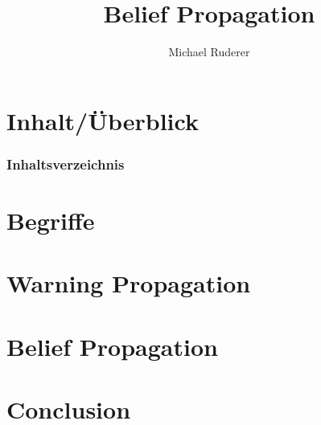 \documentclass{beamer}
\title{Belief Propagation}
\author{Michael Ruderer}
\institute
{Uni Ulm\\}
\begin{document}
\hspace*{-1.49cm}
\frame[plain]{\titlepage}

\hspace*{-0.7cm}
\section*{Inhalt/Überblick} %
\begin{frame}
  \frametitle{Inhaltsverzeichnis}
  \tableofcontents
\end{frame}


\section{Begriffe}


\section{Warning Propagation}


\section{Belief Propagation}

\section{Conclusion}
\end{document}
